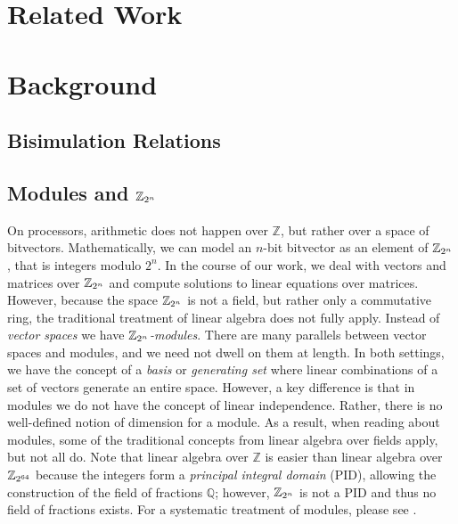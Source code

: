 \section{Related Work}

\section{Background}

\subsection{Bisimulation Relations}

\subsection{Modules and $\mathbb{Z}_{2^{n}}$}

On processors, arithmetic does not happen over $\mathbb{Z}$, but
rather over a space of bitvectors. Mathematically, we can model
an $n$-bit bitvector as an element of $\mathbb{Z}_{2^{n}}$, that is integers
modulo $2^n$. In the course of our work, we deal with vectors and
matrices over $\mathbb{Z}_{2^{n}}$ and compute solutions to linear equations over
matrices. However, because the space $\mathbb{Z}_{2^{n}}$ is not a field, but
rather only a commutative ring, the traditional treatment of linear
algebra does not fully apply. Instead of \emph{vector spaces} we
have \emph{$\mathbb{Z}_{2^{n}}$-modules}. There are many parallels between vector
spaces and modules, and we need not dwell on them at length. In both
settings, we have the concept of a \emph{basis} or \emph{generating
set} where linear combinations of a set of vectors generate an
entire space. However, a key difference is that in modules we do
not have the concept of linear independence. Rather, there is no
well-defined notion of dimension for a module. As a result, when
reading about modules, some of the traditional concepts from linear
algebra over fields apply, but not all do. Note that linear algebra
over $\mathbb{Z}$ is easier than linear algebra over $\mathbb{Z}_{2^{64}}$ because
the integers form a \emph{principal integral domain} (PID), allowing
the construction of the field of fractions $\mathbb{Q}$; however,
$\mathbb{Z}_{2^{n}}$ is not a PID and thus no field of fractions exists. For a
systematic treatment of modules, please see .


